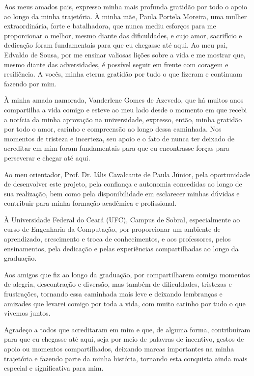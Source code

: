 Aos meus amados pais, expresso minha mais profunda gratidão por todo o apoio ao longo da minha trajetória. À minha mãe, Paula Portela Moreira, uma mulher extraordinária, forte e batalhadora, que nunca mediu esforços para me proporcionar o melhor, mesmo diante das dificuldades, e cujo amor, sacrifício e dedicação foram fundamentais para que eu chegasse até aqui. Ao meu pai, Edvaldo de Sousa, por me ensinar valiosas lições sobre a vida e me mostrar que, mesmo diante das adversidades, é possível seguir em frente com coragem e resiliência. A vocês, minha eterna gratidão por tudo o que fizeram e continuam fazendo por mim.

À minha amada namorada, Vanderlene Gomes de Azevedo, que há muitos anos compartilha a vida comigo e esteve ao meu lado desde o momento em que recebi a notícia da minha aprovação na universidade, expresso, então, minha gratidão por todo o amor, carinho e compreensão ao longo dessa caminhada. Nos momentos de tristeza e incerteza, seu apoio e o fato de nunca ter deixado de acreditar em mim foram fundamentais para que eu encontrasse forças para perseverar e chegar até aqui.

Ao meu orientador, Prof. Dr. Iális Cavalcante de Paula Júnior, pela oportunidade de desenvolver este projeto, pela confiança e autonomia concedidas ao longo de sua realização, bem como pela disponibilidade em esclarecer minhas dúvidas e contribuir para minha formação acadêmica e profissional.

À Universidade Federal do Ceará (UFC), Campus de Sobral, especialmente ao curso de Engenharia da Computação, por proporcionar um ambiente de aprendizado, crescimento e troca de conhecimentos, e aos professores, pelos ensinamentos, pela dedicação e pelas experiências compartilhadas ao longo da graduação.

Aos amigos que fiz ao longo da graduação, por compartilharem comigo momentos de alegria, descontração e diversão, mas também de dificuldades, tristezas e frustrações, tornando essa caminhada mais leve e deixando lembranças e amizades que levarei comigo por toda a vida, com muito carinho por tudo o que vivemos juntos.

Agradeço a todos que acreditaram em mim e que, de alguma forma, contribuíram para que eu chegasse até aqui, seja por meio de palavras de incentivo, gestos de apoio ou momentos compartilhados, deixando marcas importantes na minha trajetória e fazendo parte da minha história, tornando esta conquista ainda mais especial e significativa para mim.